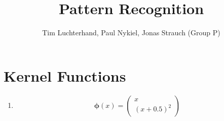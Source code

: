 \documentclass[DIN, pagenumber=false, fontsize=11pt, parskip=half]{scrartcl}
\title{Pattern Recognition}
\author{Tim Luchterhand, Paul Nykiel, Jonas Strauch (Group P)}
\begin{document}
    \maketitle
    \section{Kernel Functions}
    \begin{enumerate}
        \item 
            \begin{equation*}
                \bm{\phi}(x) = \begin{pmatrix} x \\ {(x + 0.5)}^2 \end{pmatrix}
            \end{equation*}
    \end{enumerate}
\end{document}
